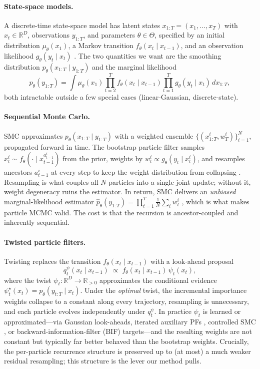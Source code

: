 \documentclass{article}
\begin{document}
\paragraph{State-space models.} A discrete-time state-space model has latent states $x_{1:T} = (x_1, \ldots, x_T)$ with $x_t \in \mathbb{R}^D$, observations $y_{1:T}$, and parameters $\theta \in \Theta$, specified by an initial distribution $\mu_\theta(x_1)$, a Markov transition $f_\theta(x_t \mid x_{t-1})$, and an observation likelihood $g_\theta(y_t \mid x_t)$ \citep{sarkka2013bayesian}. The two quantities we want are the smoothing distribution $p_\theta(x_{1:T} \mid y_{1:T})$ and the marginal likelihood
\[
    p_\theta(y_{1:T}) = \int \mu_\theta(x_1)\prod_{t=2}^T f_\theta(x_t \mid x_{t-1}) \prod_{t=1}^T g_\theta(y_t \mid x_t) \, dx_{1:T},
\]
both intractable outside a few special cases (linear-Gaussian, discrete-state).

\paragraph{Sequential Monte Carlo.} SMC approximates $p_\theta(x_{1:T} \mid y_{1:T})$ with a weighted ensemble $\{(x_{1:T}^{i}, w_T^{i})\}_{i=1}^N$, propagated forward in time. The bootstrap particle filter samples $x_t^{i} \sim f_\theta(\cdot \mid x_{t-1}^{a_{t-1}^{i}})$ from the prior, weights by $w_t^{i} \propto g_\theta(y_t \mid x_t^{i})$, and resamples ancestors $a_{t-1}^{i}$ at every step to keep the weight distribution from collapsing \citep{gordon1993novel,doucet2001sequential}. Resampling is what couples all $N$ particles into a single joint update; without it, weight degeneracy ruins the estimator. In return, SMC delivers an \emph{unbiased} marginal-likelihood estimator $\hat{p}_\theta(y_{1:T}) = \prod_{t=1}^T \tfrac{1}{N}\sum_i w_t^{i}$ \citep{delmoral2004feynman}, which is what makes particle MCMC valid. The cost is that the recursion is ancestor-coupled and inherently sequential.

\paragraph{Twisted particle filters.} Twisting \citep{whiteley2014twisted,guarniero2017iterated,heng2020controlled} replaces the transition $f_\theta(x_t \mid x_{t-1})$ with a look-ahead proposal
\[
    q_t^\psi(x_t \mid x_{t-1}) \;\propto\; f_\theta(x_t \mid x_{t-1}) \, \psi_t(x_t),
\]
where the twist $\psi_t : \mathbb{R}^D \to \mathbb{R}_{>0}$ approximates the conditional evidence $\psi_t^\star(x_t) = p_\theta(y_{t:T} \mid x_t)$. Under the \emph{optimal} twist, the incremental importance weights collapse to a constant along every trajectory, resampling is unnecessary, and each particle evolves independently under $q_t^\psi$. In practice $\psi_t$ is learned or approximated---via Gaussian look-aheads, iterated auxiliary PFs \citep{guarniero2017iterated}, controlled SMC \citep{heng2020controlled}, or backward-information-filter (BIF) targets---and the resulting weights are not constant but typically far better behaved than the bootstrap weights. Crucially, the per-particle recurrence structure is preserved up to (at most) a much weaker residual resampling; this structure is the lever our method pulls.
\end{document}
